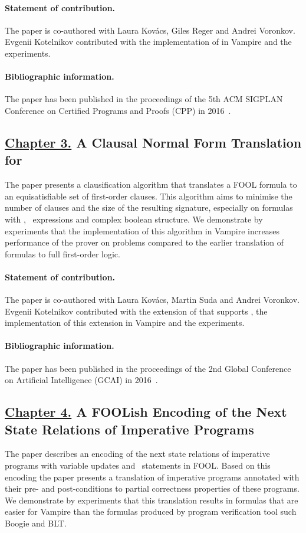 \paragraph{Statement of contribution.} The paper is co-authored with Laura Kov\'{a}cs, Giles Reger and Andrei Voronkov. Evgenii Kotelnikov contributed with the implementation of \folb{} in Vampire and the experiments.

\paragraph{Bibliographic information.} The paper has been published in the proceedings of the 5th ACM SIGPLAN Conference on Certified Programs and Proofs (CPP) in 2016~\cite{VampireAndFOOL}.

\subsection*{\hyperref[chap:cnf]{Chapter 3.} A Clausal Normal Form Translation\\for \folb{}}
The paper presents a clausification algorithm that translates a FOOL formula to an equisatisfiable set of first-order clauses. This algorithm aims to minimise the number of clauses and the size of the resulting signature, especially on formulas with \ITE, \LETIN\ expressions and complex boolean structure. We demonstrate by experiments that the implementation of this algorithm in Vampire increases performance of the prover on \folb{} problems compared to the earlier translation of \folb{} formulas to full first-order logic.

\paragraph{Statement of contribution.} The paper is co-authored with Laura Kov\'{a}cs, Martin Suda and Andrei Voronkov. Evgenii Kotelnikov contributed with the extension of \newcnf{} that supports \folb{}, the implementation of this extension in Vampire and the experiments.

\paragraph{Bibliographic information.} The paper has been published in the proceedings of the 2nd Global Conference on Artificial Intelligence (GCAI) in 2016~\cite{FOOLCNF}.

\subsection*{\hyperref[chap:boogie]{Chapter 4.} A FOOLish Encoding of the Next State Relations of Imperative Programs}
The paper describes an encoding of the next state relations of imperative programs with variable updates and \ITE\ statements in FOOL. Based on this encoding the paper presents a translation of imperative programs annotated with their pre- and post-conditions to partial correctness properties of these programs. We demonstrate by experiments that this translation results in formulas that are easier for Vampire than the formulas produced by program verification tool such Boogie and BLT.

